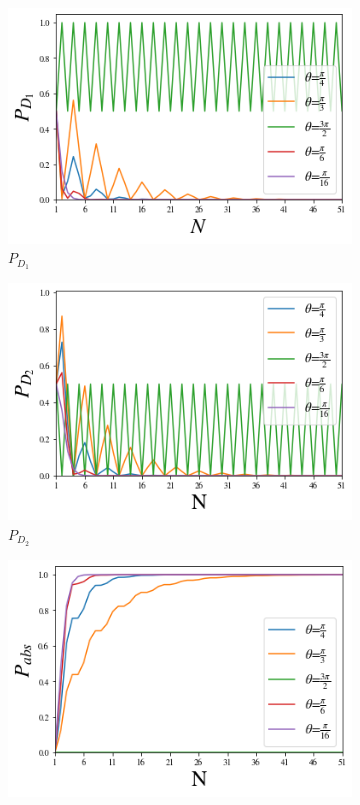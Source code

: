 \documentclass[12pt]{book}
\begin{document}
\begin{figure}[!t]
\centering
\begin{subfigure}[b]{0.45\linewidth}
\includegraphics[width=\linewidth]{images/BsFijo_azumaD1.png}
\caption{$P_{D_{1}}$}
\label{fig:BS1}
\end{subfigure}
\begin{subfigure}[b]{0.45\linewidth}
\includegraphics[width=\linewidth]{images/BsFijo_azumaD2.png}
\caption{$P_{D_{2}}$}
\label{fig:westminster_aerea}
\end{subfigure}
\begin{subfigure}[b]{0.45\linewidth}
\includegraphics[width=\linewidth]{images/BsFijo_azumaabs.png}

\end{subfigure}
\end{figure}
\end{document}
